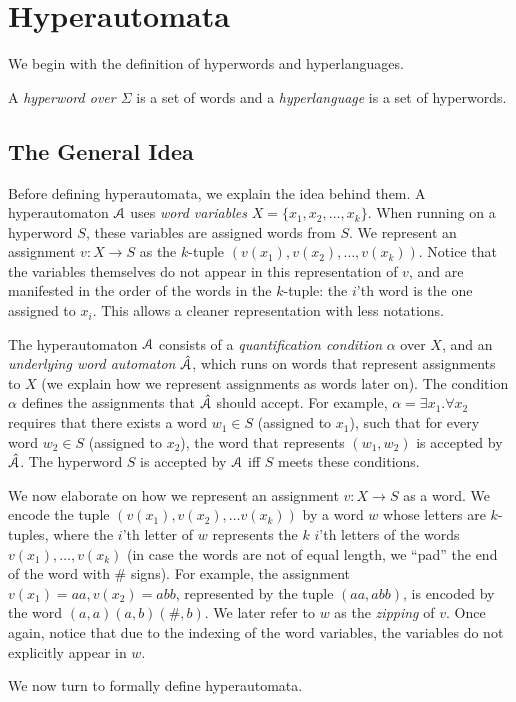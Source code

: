 \section{Hyperautomata}
\label{sec:ha}

We begin with the definition of hyperwords and hyperlanguages.

\begin{definition}
\label{def:hword}
A {\em hyperword over $\Sigma$} is a set of words and a 
{\em hyperlanguage} is a set of hyperwords.
\end{definition}

\subsection{The General Idea}

Before defining hyperautomata, we explain the idea behind them. A 
hyperautomaton $\mathcal{A}$ uses {\em word variables} $X  =\{x_1,x_2,\ldots, x_k\}$. 
When running on a hyperword $S$, these variables are assigned words from $S$. We 
represent an assignment $v:X\rightarrow S$ as the $k$-tuple 
$(v(x_1),v(x_2),\ldots, v(x_k))$. Notice that the variables themselves do not 
appear in this representation of $v$, and are manifested in the order of the 
words in the $k$-tuple: the $i$'th word is the one assigned to $x_i$. This 
allows a cleaner representation with less notations. 

The hyperautomaton $\mathcal{A}$ consists of a {\em quantification condition} $\alpha$ 
over $X$, and an {\em underlying word automaton} $\hat{\mathcal{A}}$, which runs on words 
that represent assignments to $X$ (we explain how we represent assignments as 
words later on). The condition $\alpha$ defines the assignments that $\hat{\mathcal{A}}$ 
should accept. For example, $\alpha = \exists x_1.\forall x_2$ requires that 
there exists a word $w_1\in S$ (assigned to $x_1$), such that for every word 
$w_2\in S$ (assigned to $x_2$), the word that represents $(w_1,w_2)$ is accepted 
by $\hat{\mathcal{A}}$. The hyperword $S$ is accepted by $\mathcal{A}$ iff $S$ meets these 
conditions. 

We now elaborate on how we represent an assignment $v:X\rightarrow S$ as a word. We encode the tuple $(v(x_1),v(x_2),\ldots v(x_k))$ by a word $w$ whose letters are $k$-tuples, where the $i$'th letter of $w$ represents the $k$ $i$'th letters of the words $v(x_1),\ldots ,v(x_k)$ (in case the words are not of equal length, we ``pad'' the end of the word with $\#$ signs). 
For example, the assignment $v(x_1)=aa,v(x_2)=abb$, represented by the tuple $(aa,abb)$, is encoded by the word 
$ (a,a)(a,b)(\#,b)$.
We later refer to $w$ as the {\em zipping} of $v$. Once again, notice that due to the indexing of the word variables, the variables do not explicitly appear in $w$.   


We now turn to formally define hyperautomata.


%

